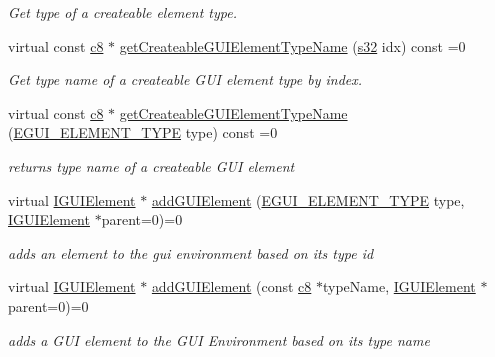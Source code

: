 \begin{DoxyCompactItemize}
\begin{DoxyCompactList}\small\item\em Get type of a createable element type. \end{DoxyCompactList}\item 
virtual const \hyperlink{namespaceirr_a9395eaea339bcb546b319e9c96bf7410}{c8} $\ast$ \hyperlink{classirr_1_1gui_1_1IGUIElementFactory_aa8007c17ea40b74666c1d04c9d4de85f}{get\+Createable\+G\+U\+I\+Element\+Type\+Name} (\hyperlink{namespaceirr_ac66849b7a6ed16e30ebede579f9b47c6}{s32} idx) const =0
\begin{DoxyCompactList}\small\item\em Get type name of a createable G\+UI element type by index. \end{DoxyCompactList}\item 
virtual const \hyperlink{namespaceirr_a9395eaea339bcb546b319e9c96bf7410}{c8} $\ast$ \hyperlink{classirr_1_1gui_1_1IGUIElementFactory_a1e692e1f746ee69815bf25981ee0facf}{get\+Createable\+G\+U\+I\+Element\+Type\+Name} (\hyperlink{namespaceirr_1_1gui_ae4d66df0ecf4117cdbcf9f22404bd254}{E\+G\+U\+I\+\_\+\+E\+L\+E\+M\+E\+N\+T\+\_\+\+T\+Y\+PE} type) const =0
\begin{DoxyCompactList}\small\item\em returns type name of a createable G\+UI element \end{DoxyCompactList}\item 
virtual \hyperlink{classirr_1_1gui_1_1IGUIElement}{I\+G\+U\+I\+Element} $\ast$ \hyperlink{classirr_1_1gui_1_1IGUIElementFactory_aaaa0dda5493286ff745310b441347019}{add\+G\+U\+I\+Element} (\hyperlink{namespaceirr_1_1gui_ae4d66df0ecf4117cdbcf9f22404bd254}{E\+G\+U\+I\+\_\+\+E\+L\+E\+M\+E\+N\+T\+\_\+\+T\+Y\+PE} type, \hyperlink{classirr_1_1gui_1_1IGUIElement}{I\+G\+U\+I\+Element} $\ast$parent=0)=0
\begin{DoxyCompactList}\small\item\em adds an element to the gui environment based on its type id \end{DoxyCompactList}\item 
virtual \hyperlink{classirr_1_1gui_1_1IGUIElement}{I\+G\+U\+I\+Element} $\ast$ \hyperlink{classirr_1_1gui_1_1IGUIElementFactory_aec55be9ef891ba1b19c5d9c5a85130a4}{add\+G\+U\+I\+Element} (const \hyperlink{namespaceirr_a9395eaea339bcb546b319e9c96bf7410}{c8} $\ast$type\+Name, \hyperlink{classirr_1_1gui_1_1IGUIElement}{I\+G\+U\+I\+Element} $\ast$parent=0)=0
\begin{DoxyCompactList}\small\item\em adds a G\+UI element to the G\+UI Environment based on its type name \end{DoxyCompactList}\item 

\end{DoxyCompactItemize}
